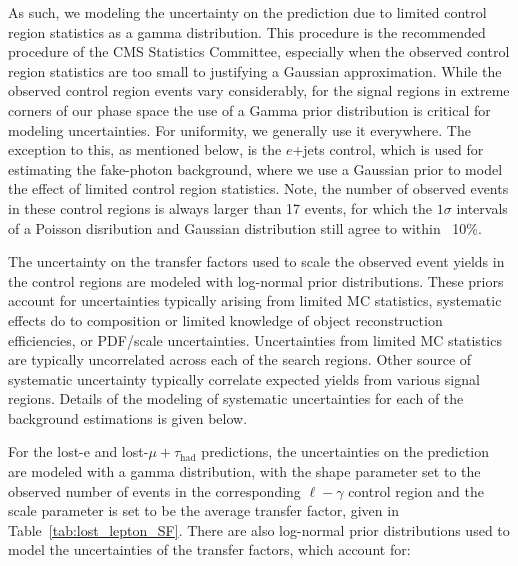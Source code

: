 As such, we modeling the uncertainty on the prediction due to limited 
control region statistics as a gamma distribution.  This procedure is the 
recommended procedure of the CMS Statistics Committee, especially when the 
observed control region statistics are too small to justifying a Gaussian 
approximation.  While the observed control region events vary considerably, 
for the signal regions in extreme corners of our phase space the use of a 
Gamma prior distribution is critical for modeling uncertainties.  For uniformity, 
we generally use it everywhere.  The exception to this, as mentioned below, is 
the $e$+jets control, 
which is used for estimating the fake-photon background, where we use a Gaussian prior 
to model the effect of limited control region statistics.  Note, the number of 
observed events in these control regions is always larger than 17 events, for 
which the $1\sigma$ intervals of a Poisson disribution and Gaussian distribution
still agree to within ~10\%.  

The uncertainty on the transfer factors used to scale the observed event yields 
in the control regions are modeled with log-normal prior
distributions.  These priors account for uncertainties typically arising 
from limited MC statistics, systematic effects do to composition or limited knowledge 
of object reconstruction efficiencies, or PDF/scale uncertainties.  Uncertainties 
from limited MC statistics are typically uncorrelated across each of the 
search regions.  Other source of systematic uncertainty typically correlate 
expected yields from various signal regions.  Details of the modeling of 
systematic uncertainties for each of the background estimations is given below. 

For the lost-e and lost-$\mu+\tau_{\mathrm{had}}$ predictions, the uncertainties
on the prediction are modeled with a gamma distribution, with the 
shape parameter set to the observed number of events in the corresponding
$\ell-\gamma$ control region and the scale parameter is set to be the
average transfer factor, given in Table~\ref{tab:lost_lepton_SF}.  There 
are also log-normal prior distributions used to model the uncertainties
of the transfer factors, which account for:

